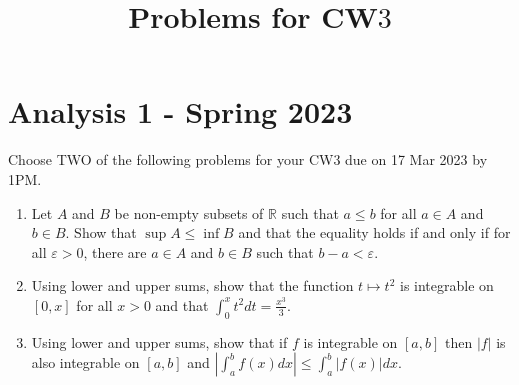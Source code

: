 \documentclass[10pt]{article}
\title{Problems for $\mathbf{C W} 3$ }
\author{}
\date{}
\begin{document}
\maketitle
\section{Analysis 1 - Spring 2023}
Choose TWO of the following problems for your CW3 due on 17 Mar 2023 by 1PM.

\begin{enumerate}
  \item Let $A$ and $B$ be non-empty subsets of $\mathbb{R}$ such that $a \leq b$ for all $a \in A$ and $b \in B$. Show that $\sup A \leq \inf B$ and that the equality holds if and only if for all $\varepsilon>0$, there are $a \in A$ and $b \in B$ such that $b-a<\varepsilon$.

  \item Using lower and upper sums, show that the function $t \mapsto t^{2}$ is integrable on $[0, x]$ for all $x>0$ and that $\int_{0}^{x} t^{2} d t=\frac{x^{3}}{3}$.

  \item Using lower and upper sums, show that if $f$ is integrable on $[a, b]$ then $|f|$ is also integrable on $[a, b]$ and $\left|\int_{a}^{b} f(x) d x\right| \leq \int_{a}^{b}|f(x)| d x$.

\end{enumerate}
\end{document}
